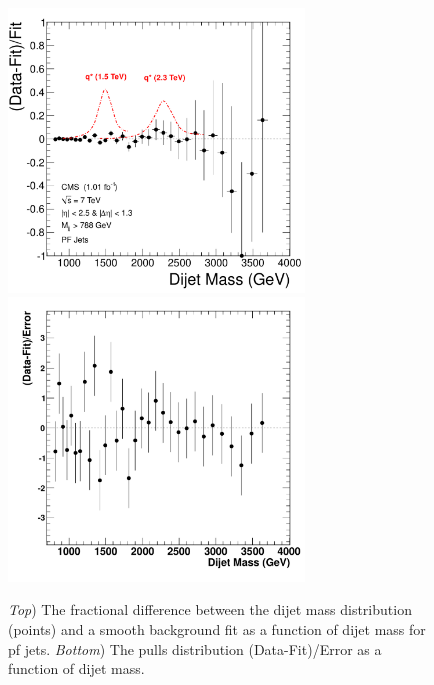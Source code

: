 \begin{figure}[!ht]
  \begin{center}
    \includegraphics[width=0.7\textwidth]{Figures/Fractional_Diff_pf.pdf}
    \includegraphics[width=0.7\textwidth]{Figures/Pulls_pf.pdf}
    \caption{ \textit{Top}) The fractional difference between the
dijet mass distribution (points) and a smooth background fit as a
function of dijet mass for pf jets. \textit{Bottom}) The pulls distribution
(Data-Fit)/Error as a function of dijet mass.}
    \label{FracDiff_pf}
  \end{center}
\end{figure}

